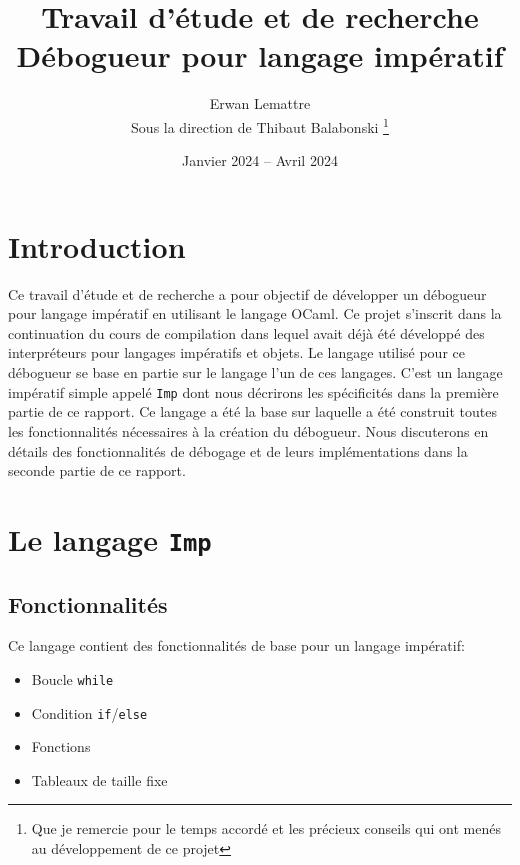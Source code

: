 \documentclass{article}
\title{Travail d'étude et de recherche\\Débogueur pour langage impératif}
\author{Erwan Lemattre\\Sous la direction de Thibaut Balabonski
\thanks{Que je remercie pour le temps accordé et les précieux 
conseils qui ont menés au développement de ce projet}}
\date{Janvier 2024 -- Avril 2024}
\begin{document}
\maketitle

\vspace{1cm}
\section{Introduction}
Ce travail d'étude et de recherche a pour objectif de développer un débogueur 
pour langage impératif en utilisant le langage OCaml. Ce projet s'inscrit dans 
la continuation du cours de compilation dans lequel avait déjà été développé 
des interpréteurs pour langages impératifs et objets. Le langage 
utilisé pour ce débogueur se base en partie sur le langage l'un de ces langages.
C'est un langage impératif simple appelé \texttt{Imp} dont nous décrirons les 
spécificités dans la première partie de ce rapport. Ce langage a été la base 
sur laquelle a été construit toutes les fonctionnalités nécessaires à la 
création du débogueur. Nous discuterons en détails des fonctionnalités de 
débogage et de leurs implémentations dans la seconde partie de ce rapport.

\newpage


\section{Le langage \texttt{Imp}}

\subsection{Fonctionnalités}
Ce langage contient des fonctionnalités de base pour un langage impératif:
\begin{itemize}
    \item Boucle \texttt{while}
    \item Condition \texttt{if}/\texttt{else}
    \item Fonctions
    \item Tableaux de taille fixe
\end{itemize}
\end{document}
